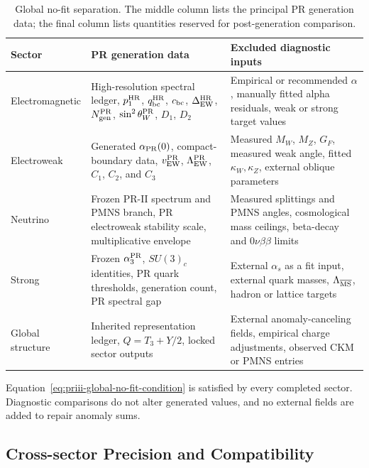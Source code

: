 \documentclass[11pt]{article}
\begin{document}
\begin{table}[htbp]
\centering
\caption{Global no-fit separation.  The middle column lists the principal PR generation data; the final column lists quantities reserved for post-generation comparison.}
\label{tab:priii-global-provenance}
\small
\begin{tabular}{p{}p{}p{}}
\toprule
\textbf{Sector} & \textbf{PR generation data} & \textbf{Excluded diagnostic inputs} \\
\midrule
Electromagnetic
&
High-resolution spectral ledger, \(p_1^{\rm HR}\), \(q_{\rm bc}^{\rm HR}\), \(c_{\rm bc}\), \(\Delta_{\rm EW}^{\rm HR}\), \(N_{\rm gen}^{\rm PR}\), \(\sin^2\theta_W^{\rm PR}\), \(D_1\), \(D_2\)
&
Empirical or recommended \(\alpha\), manually fitted alpha residuals, weak or strong target values
\\[0.5em]

Electroweak
&
Generated \(\alpha_{\rm PR}(0)\), compact-boundary data, \(v_{\rm EW}^{\rm PR}\), \(\Lambda_{\rm EW}^{\rm PR}\), \(C_1\), \(C_2\), and \(C_3\)
&
Measured \(M_W\), \(M_Z\), \(G_F\), measured weak angle, fitted \(\kappa_W,\kappa_Z\), external oblique parameters
\\[0.5em]

Neutrino
&
Frozen PR-II spectrum and PMNS branch, PR electroweak stability scale, multiplicative envelope
&
Measured splittings and PMNS angles, cosmological mass ceilings, beta-decay and \(0\nu\beta\beta\) limits
\\[0.5em]

Strong
&
Frozen \(\alpha_3^{\rm PR}\), \(SU(3)_c\) identities, PR quark thresholds, generation count, PR spectral gap
&
External \(\alpha_s\) as a fit input, external quark masses, \(\Lambda_{\overline{\rm MS}}\), hadron or lattice targets
\\[0.5em]

Global structure
&
Inherited representation ledger, \(Q=T_3+Y/2\), locked sector outputs
&
External anomaly-canceling fields, empirical charge adjustments, observed CKM or PMNS entries
\\
\bottomrule
\end{tabular}
\end{table}

Equation~\eqref{eq:priii-global-no-fit-condition} is satisfied by every completed sector.  Diagnostic comparisons do not alter generated values, and no external fields are added to repair anomaly sums.

\subsection{Cross-sector Precision and Compatibility}
\label{subsec:priii-cross-sector-summary}
\end{document}
